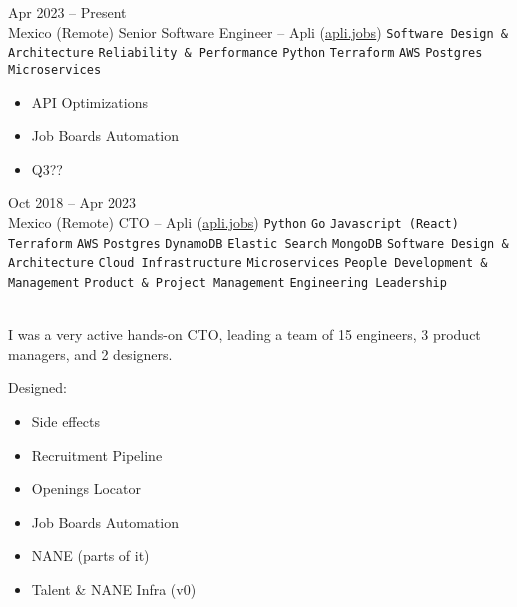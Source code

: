 \documentclass[9pt]{developercv} %
\begin{document}
\begin{entrylist}
    \entry
        {
            Apr 2023 -- Present
            \\\footnotesize{Mexico (Remote)}
        }
        {Senior Software Engineer – Apli ({\href{https://apli.jobs/}{\underline{apli.jobs}}}) }
        {
            \texttt{Software Design \& Architecture}
            \slashsep\texttt{Reliability \& Performance}
            \slashsep\texttt{Python}
            \slashsep\texttt{Terraform}
            \slashsep\texttt{AWS}
            \slashsep\texttt{Postgres}
            \slashsep\texttt{Microservices}
        }
        {
            \begin{itemize}
                \item API Optimizations
                \item Job Boards Automation
                \item Q3??
            \end{itemize}           
        }

    \entry
        {
            Oct 2018 -- Apr 2023
            \\\footnotesize{Mexico (Remote)}
        }
        {CTO – Apli ({\href{https://apli.jobs/}{\underline{apli.jobs}}}) }
        {
            \texttt{Python}
            \slashsep\texttt{Go}
            \slashsep\texttt{Javascript (React)}
            \slashsep\texttt{Terraform}
            \slashsep\texttt{AWS}
            \slashsep\texttt{Postgres}
            \slashsep\texttt{DynamoDB}
            \slashsep\texttt{Elastic Search}
            \slashsep\texttt{MongoDB}
            \slashsep\texttt{Software Design \& Architecture}
            \slashsep\texttt{Cloud Infrastructure}
            \slashsep\texttt{Microservices}
            \slashsep\texttt{People Development \& Management}
            \slashsep\texttt{Product \& Project Management}
            \slashsep\texttt{Engineering Leadership}
        }
        {\\
            I was a very active hands-on CTO, leading a team of 15 engineers, 3 product managers, and 2 designers.

            Designed: 

            \begin{itemize}
                \item Side effects
                \item Recruitment Pipeline
                \item Openings Locator
                \item Job Boards Automation
                \item NANE (parts of it)
                \item Talent \& NANE Infra (v0)
            \end{itemize}       
        }


\end{entrylist}
\end{document}
